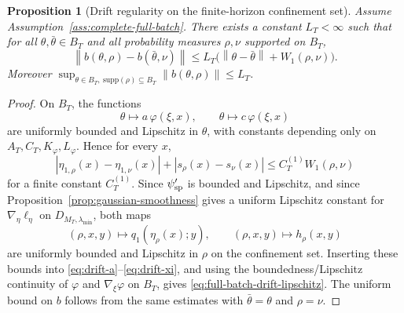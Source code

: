 \documentclass[11pt]{article}
\newtheorem{proposition}[theorem]{Proposition}
\theoremstyle{definition}
\newcommand{\supp}{\mathrm{supp}}
\newcommand{\norm}[1]{\left\lVert #1 \right\rVert}
\begin{document}
\begin{proposition}[Drift regularity on the finite-horizon confinement set]
\label{prop:softplus-drift-regularity}
Assume Assumption~\ref{ass:complete-full-batch}. There exists a constant
$L_T<\infty$ such that for all $\theta,\bar\theta\in B_T$ and all probability
measures $\rho,\nu$ supported on $B_T$,
\begin{equation}
  \norm{b(\theta,\rho)-b(\bar\theta,\nu)}
  \le
  L_T\big(\norm{\theta-\bar\theta}+W_1(\rho,\nu)\big).
  \label{eq:full-batch-drift-lipschitz}
\end{equation}
Moreover $\sup_{\theta\in B_T,\ \supp(\rho)\subseteq B_T}\norm{b(\theta,\rho)}
\le L_T$.
\end{proposition}

\begin{proof}
On $B_T$, the functions
\[
  \theta\mapsto a\,\varphi(\xi,x),
  \qquad
  \theta\mapsto c\,\varphi(\xi,x)
\]
are uniformly bounded and Lipschitz in $\theta$, with constants depending only
on $A_T,C_T,K_\varphi,L_\varphi$. Hence for every $x$,
\[
  |\eta_{1,\rho}(x)-\eta_{1,\nu}(x)| + |s_\rho(x)-s_\nu(x)|
  \le
  C_T^{(1)} W_1(\rho,\nu)
\]
for a finite constant $C_T^{(1)}$. Since $\psi_{\rm sp}'$ is bounded and
Lipschitz, and since Proposition~\ref{prop:gaussian-smoothness} gives a uniform
Lipschitz constant for $\nabla_\eta\ell_\eta$ on
$D_{M_T,\lambda_{\min}}$, both maps
\[
  (\rho,x,y)\mapsto q_1(\eta_\rho(x);y),
  \qquad
  (\rho,x,y)\mapsto h_\rho(x,y)
\]
are uniformly bounded and Lipschitz in $\rho$ on the confinement set. Inserting
these bounds into \eqref{eq:drift-a}--\eqref{eq:drift-xi}, and using the
boundedness/Lipschitz continuity of $\varphi$ and $\nabla_\xi\varphi$ on $B_T$,
gives \eqref{eq:full-batch-drift-lipschitz}. The uniform bound on $b$ follows
from the same estimates with $\bar\theta=\theta$ and $\rho=\nu$.
\end{proof}
\end{document}
